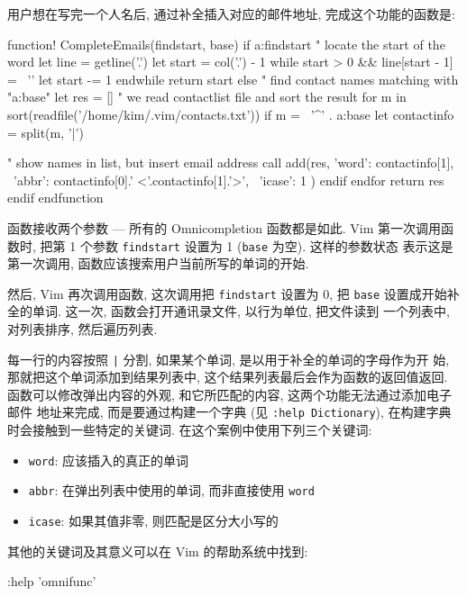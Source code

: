 用户想在写完一个人名后, 通过补全插入对应的邮件地址, 完成这个功能的函数是:
\begin{vimcode}
function! CompleteEmails(findstart, base)
	  if a:findstart
	    " locate the start of the word
	    let line = getline('.')
	    let start = col('.') - 1
	    while start > 0 && line[start - 1] =~ '\a'
	      let start -= 1
	    endwhile
	    return start
	  else
	    " find contact names matching with "a:base"
	    let res = []
		 " we read contactlist file and sort the result
	    for m in sort(readfile('/home/kim/.vim/contacts.txt'))
	      if m =~ '^' . a:base
				let contactinfo = split(m, '|')
\end{vimcode}
\begin{vimcode}
		      " show names in list, but insert email address
		      call add(res, {'word': contactinfo[1],
                     \ 'abbr': contactinfo[0].' <'.contactinfo[1].'>',
                 \ 'icase': 1} )
	      endif
	    endfor
	    return res
	  endif
	endfunction
\end{vimcode}

函数接收两个参数 --- 所有的 Omnicompletion 函数都是如此. Vim 第一次调用函数时,
把第 1 个参数 \texttt{findstart} 设置为 1 (\texttt{base} 为空). 这样的参数状态
表示这是第一次调用, 函数应该搜索用户当前所写的单词的开始.

然后, Vim 再次调用函数, 这次调用把 \texttt{findstart} 设置为 0, 把 \texttt{base}
设置成开始补全的单词. 这一次, 函数会打开通讯录文件, 以行为单位, 把文件读到
一个列表中, 对列表排序, 然后遍历列表.

每一行的内容按照 \texttt{|} 分割, 如果某个单词, 是以用于补全的单词的字母作为开
始, 那就把这个单词添加到结果列表中, 这个结果列表最后会作为函数的返回值返回.
函数可以修改弹出内容的外观, 和它所匹配的内容, 这两个功能无法通过添加电子邮件
地址来完成, 而是要通过构建一个字典 (见 \texttt{:help Dictionary}), 在构建字典
时会接触到一些特定的关键词. 在这个案例中使用下列三个关键词:
\begin{itemize}
    \item \texttt{word}: 应该插入的真正的单词
    \item \texttt{abbr}: 在弹出列表中使用的单词, 而非直接使用 \texttt{word}
    \item \texttt{icase}: 如果其值非零, 则匹配是区分大小写的
\end{itemize}

其他的关键词及其意义可以在 Vim 的帮助系统中找到:
\begin{vimcode}
:help 'omnifunc'
\end{vimcode}

